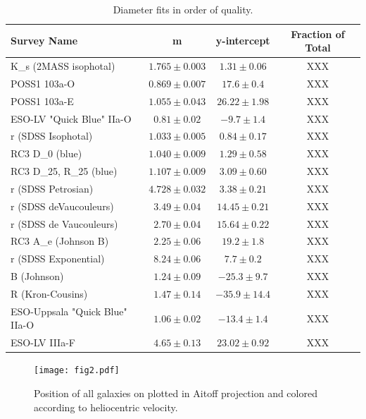 \documentclass[iop]{emulateapj-rtx4}
\begin{document}
\begin{table}[ht]\footnotesize
\begin{center}
\begin{tabular}{l c c c}
 \hline \hline
 Survey Name                			& m   				& y-intercept			& Fraction of Total	\\
  \hline \hline 
K\_s (2MASS isophotal)			& $1.765 \pm 0.003$		& $1.31 \pm 0.06$		&	XXX			\\
POSS1 103a-O					& $0.869 \pm  0.007$	& $17.6 \pm 0.4$		&      XXX			\\
POSS1 103a-E					& $1.055 \pm 0.043$		& $26.22 \pm 1.98$		&	XXX			\\
ESO-LV "Quick Blue" IIa-O		& $0.81 \pm 0.02$		& $-9.7 \pm 1.4$		&	XXX			\\
r (SDSS Isophotal)				& $1.033 \pm 0.005$		& $0.84 \pm 0.17$		&	XXX			\\
RC3 D\_0 (blue)				& $1.040 \pm 0.009$		& $1.29 \pm 0.58$		&	XXX			\\
RC3 D\_25, R\_25 (blue)			& $1.107 \pm 0.009$		& $3.09 \pm 0.60$		&	XXX			\\
r (SDSS Petrosian)				& $4.728 \pm 0.032$		& $3.38 \pm 0.21$		&	XXX			\\
r (SDSS deVaucouleurs)			& $3.49 \pm 0.04$		& $14.45 \pm 0.21$		&	XXX			\\
r (SDSS de Vaucouleurs)			& $2.70 \pm 0.04$		& $15.64 \pm 0.22$		&	XXX			\\
RC3 A\_e (Johnson B)			& $2.25 \pm 0.06$		& $19.2 \pm 1.8$		&	XXX			\\
r (SDSS Exponential)			& $8.24 \pm 0.06$		& $7.7 \pm 0.2$		&	XXX			\\
B (Johnson)					& $1.24 \pm 0.09$		& $-25.3 \pm 9.7$		&	XXX			\\
R (Kron-Cousins)				& $1.47 \pm 0.14$		& $-35.9 \pm 14.4$		&	XXX			\\
ESO-Uppsala "Quick Blue" IIa-O	& $1.06 \pm 0.02$		& $-13.4 \pm 1.4$		&	XXX			\\
ESO-LV IIIa-F					& $4.65 \pm 0.13$		& $23.02 \pm 0.92$		&	XXX			\\
\hline
\end{tabular}
\end{center}
  \caption{\small{Diameter fits in order of quality.}}
  \label{diameter_fits}
\end{table}


\begin{figure}[ht!]
        \centering
        \vspace{0pt}
        \texttt{[image: fig2.pdf]}
        \caption{\small{Position of all galaxies on plotted in Aitoff projection and colored according to heliocentric velocity.}}
        \label{allskyvhel}
\end{figure} 
\end{document}

